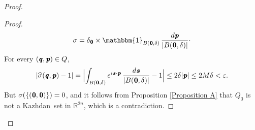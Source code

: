 \documentclass[11pt,english,a4paper]{smfart}
\numberwithin{equation}{section}
\theoremstyle{definition}
\begin{document}
\begin{proof}
\begin{proof}
\[
\sigma =\delta _{\mkern 1.5 mu\pmb{0}}\times\mathbbm{1}_{B({\mkern 1.5 mu\pmb{0}},\delta )}\,\dfrac{d{\mkern 1.5 mu\pmb{p}}}{|B({\mkern 1.5 mu\pmb{0}},\delta)| }\cdot 
\]
For every $({\mkern 1.5 mu\pmb{q}},{\mkern 1.5 mu\pmb{p}})\in{Q}$,
\[
|\widehat{\sigma }({\mkern 1.5 mu\pmb{q}},{\mkern 1.5 mu\pmb{p}})-1|=\Bigl|\int_{B({\mkern 1.5 mu\pmb{0}},\delta )}e^{i{\mkern 1.5 mu\pmb{s}}\cdot{\mkern 1.5 mu\pmb{p}}}\,\dfrac{d{\mkern 1.5 mu\pmb{s}}}{|B({\mkern 1.5 mu\pmb{0}},\delta )| }-1\Bigr|\le 2\delta |{\mkern 1.5 mu\pmb{p}}|\le 2M\delta <\varepsilon. 
\]
But $\sigma (\{({\mkern 1.5 mu\pmb{0}},{\mkern 1.5 mu\pmb{0}})\})=0$, and it follows from Proposition \ref{Proposition A} that ${Q}_{0}$ is not a {Kazhdan}\ set in ${\ensuremath{\mathbb R}}^{2n}$, which is a contradiction.
\end{proof}


\end{proof}
\end{document}
